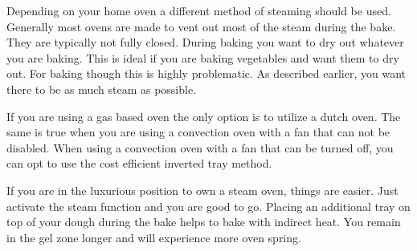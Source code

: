 \begin{table}[]
  \centering
  \caption{An overview of ovens and their different baking methods}
\end{table}

Depending on your home oven a different method
of steaming should be used. Generally most ovens
are made to vent out most of the steam during the
bake. They are typically not fully closed. During
baking you want to dry out whatever you are baking.
This is ideal if you are baking vegetables and
want them to dry out. For baking though this is
highly problematic. As described earlier, you
want there to be as much steam as possible.

If you are using a gas based oven the only option
is to utilize a dutch oven. The same is true when you
are using a convection oven with a fan that
can not be disabled. When using a convection
oven with a fan that can be turned off, you can
opt to use the cost efficient inverted tray
method.

If you are in the luxurious
position to own a steam oven, things are easier.
Just activate the steam function and you are
good to go. Placing an additional tray on top of your
dough during the bake helps to bake with indirect
heat. You remain in the gel zone longer and
will experience more oven spring.